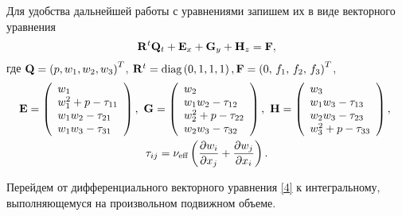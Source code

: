 Для удобства дальнейшей работы с уравнениями запишем их в виде векторного уравнения
\begin{equation}
  \label{4} 
  {\bf{R}}^t {\bf{Q}}_t  + {\bf{E}}_x  + {\bf{G}}_y  + {\bf{H}}_z  = {\bf{F}},
\end{equation}
где ${\bf{Q}} = \left( {p,w_1 ,w_2 ,w_3 } \right)^T$, ${\bf{R}}^t =
\text{diag}\left( {0,1,1,1} \right), {\bf{F}} = \left( {0,\, f_1 ,\, f_2 ,\, f_3 } \right)^T$,
\begin{gather}
  \label{5} 
  {\bf{E}} = \left( \begin{array}{l}
   w_1  \\
   w_1^2  + p - \tau _{11}  \\
   w_1 w_2  - \tau _{21}  \\
   w_1 w_3  - \tau _{31}  \\
  \end{array} \right),\ {\bf{G}} = \left( \begin{array}{l}
   w_2  \\
   w_1 w_2  - \tau _{12}  \\
   w_2^2  + p - \tau _{22}  \\
   w_2 w_3  - \tau _{32}  \\
  \end{array} \right),\ {\bf{H}} = \left( \begin{array}{l}
   w_3  \\
   w_1 w_3  - \tau _{13}  \\
   w_2 w_3  - \tau _{23}  \\
   w_3^2  + p - \tau _{33}  \\
  \end{array} \right),\  \\
  \tau _{ij}  = \nu _{\text{eff}} \left( {\frac{{\partial w_i }}{{\partial x_j }} + \frac{{\partial w_j }}{{\partial x_i }}}
  \right).
\end{gather}

Перейдем от дифференциального векторного уравнения \eqref{4} к интегральному, выполняющемуся на произвольном 
подвижном объеме.

